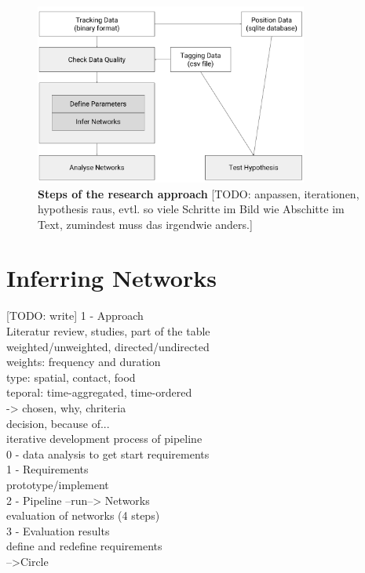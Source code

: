 \begin{figure}[htb]
	\centering
	\includegraphics[width=0.8\textwidth]{Figures/process}
	\caption[Steps of the research approach]{\textbf{Steps of the research approach} [TODO: anpassen, iterationen, hypothesis raus, evtl. so viele Schritte im Bild wie Abschitte im Text, zumindest muss das irgendwie anders.]}
	\label{fig:process}
\end{figure}


\section{Inferring Networks}
[TODO: write]
1 - Approach\\
Literatur review, studies, part of the table\\
weighted/unweighted, directed/undirected\\
weights: frequency and duration\\
type: spatial, contact, food\\
teporal: time-aggregated, time-ordered\\
-> chosen, why, chriteria\\
decision, because of...\\

iterative development process of pipeline\\
0 - data analysis to get start requirements\\
1 - Requirements\\
prototype/implement\\
2 - Pipeline --run--> Networks\\
evaluation of networks (4 steps)\\
3 - Evaluation results\\
define and redefine requirements\\
-->Circle\\







